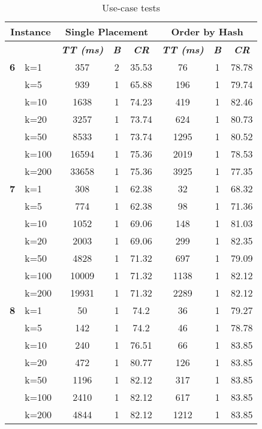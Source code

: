     \begin{table}[htbp]
    \caption{Use-case tests}
    \begin{tabular}{|l|l|c|c|c|c|c|c|}
    
    \multicolumn{ 2}{|c|}{\textbf{Instance}} & \multicolumn{ 3}{c|}{\textbf{Single Placement}} & \multicolumn{ 3}{c|}{\textbf{Order by Hash}} \\ \hline
    \multicolumn{ 2}{|l|}{} & \textbf{\textit{TT (ms)}} & \textbf{\textit{B}} & \textbf{\textit{CR}} & \textbf{\textit{TT (ms)}} & \textbf{\textit{B}} & \textbf{\textit{CR}} \\ \hline
    \multicolumn{1}{|r|}{\textbf{6}} & k=1 & 357 & 2 & 35.53 & 76 & 1 & 78.78 \\ 
     & k=5 & 939 & 1 & 65.88 & 196 & 1 & 79.74 \\ 
     & k=10 & 1638 & 1 & 74.23 & 419 & 1 & 82.46 \\ 
     & k=20 & 3257 & 1 & 73.74 & 624 & 1 & 80.73 \\ 
     & k=50 & 8533 & 1 & 73.74 & 1295 & 1 & 80.52 \\ 
     & k=100 & 16594 & 1 & 75.36 & 2019 & 1 & 78.53 \\ 
     & k=200 & 33658 & 1 & 75.36 & 3925 & 1 & 77.35 \\ \hline
    \multicolumn{1}{|r|}{\textbf{7}} & k=1 & 308 & 1 & 62.38 & 32 & 1 & 68.32 \\ 
     & k=5 & 774 & 1 & 62.38 & 98 & 1 & 71.36 \\ 
     & k=10 & 1052 & 1 & 69.06 & 148 & 1 & 81.03 \\ 
     & k=20 & 2003 & 1 & 69.06 & 299 & 1 & 82.35 \\ 
     & k=50 & 4828 & 1 & 71.32 & 697 & 1 & 79.09 \\ 
     & k=100 & 10009 & 1 & 71.32 & 1138 & 1 & 82.12 \\ 
     & k=200 & 19931 & 1 & 71.32 & 2289 & 1 & 82.12 \\ \hline
    \multicolumn{1}{|r|}{\textbf{8}} & k=1 & 50 & 1 & 74.2 & 36 & 1 & 79.27 \\ 
     & k=5 & 142 & 1 & 74.2 & 46 & 1 & 78.78 \\ 
     & k=10 & 240 & 1 & 76.51 & 66 & 1 & 83.85 \\ 
     & k=20 & 472 & 1 & 80.77 & 126 & 1 & 83.85 \\ 
     & k=50 & 1196 & 1 & 82.12 & 317 & 1 & 83.85 \\ 
     & k=100 & 2410 & 1 & 82.12 & 617 & 1 & 83.85 \\ 
     & k=200 & 4844 & 1 & 82.12 & 1212 & 1 & 83.85 \\ \hline

\end{tabular}
\end{table}
